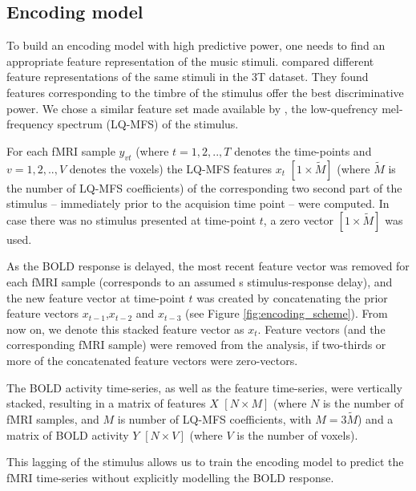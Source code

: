 \subsection*{Encoding model}

To build an encoding model with high predictive power, one needs to find an
appropriate feature representation of the music stimuli.  \citet{CTK+2012}
compared different feature representations of the same stimuli in the
3T dataset. They found features corresponding to the timbre of the
stimulus offer the best discriminative power. We chose a similar feature set made
available by \citet{HDH+2015}, the low-quefrency mel-frequency spectrum
(LQ-MFS) of the stimulus.

For each f{MRI} sample $y_{vt}$ (where $t=1,2,..,T$ denotes the time-points and
$v=1,2,..,V$ denotes the voxels) the LQ-MFS features $x_{t}$
$[1\times\widetilde{M}]$ (where $\widetilde{M}$ is the number of LQ-MFS
coefficients) of the corresponding two second part of the stimulus -- immediately
prior to the acquision time point -- were
computed. In case there was no stimulus presented at time-point $t$, a zero
vector $[1\times\widetilde{M}]$ was used. 

As the BOLD response is delayed,  the most recent feature vector was removed
for each f{MRI} sample (corresponds to an assumed \unit[2]{s} stimulus-response
delay), and the new feature vector at time-point $t$ was created by
concatenating the prior feature vectors $x_{t-1}$,$x_{t-2}$ and $x_{t-3}$ (see
Figure \ref{fig:encoding_scheme}). From now on, we denote this stacked feature
vector as $x_{t}$.  Feature vectors (and the corresponding f{MRI} sample) were
removed from the analysis, if two-thirds or more of the concatenated feature
vectors were zero-vectors.

The BOLD activity time-series, as well as the feature time-series, were
vertically stacked, resulting in a matrix of features $X$ $[N\times M]$ (where
$N$ is the number of f{MRI} samples, and $M$ is number of LQ-MFS coefficients,
with $M=3\widetilde{M}$) and a matrix of BOLD activity $Y$ $[N\times V]$ (where
$V$ is the number of voxels).

This lagging of the stimulus allows us to train the encoding model to predict
the f{MRI} time-series without explicitly modelling the BOLD response.

